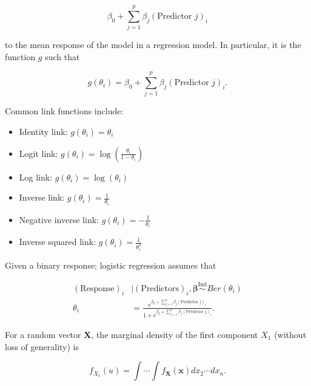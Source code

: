 \documentclass[
  letterpaper,
  DIV=11,
  numbers=noendperiod]{scrreprt}
\providecommand{\tightlist}{%
  \setlength{\itemsep}{0pt}\setlength{\parskip}{0pt}}\usepackage{longtable,booktabs,array}
\theoremstyle{definition}
\theoremstyle{definition}
\theoremstyle{plain}
\theoremstyle{remark}
\begin{document}
\[\beta_0 + \sum_{j=1}^{p} \beta_j (\text{Predictor } j)_i\]

to the mean response of the model in a regression model. In particular,
it is the function \(g\) such that

\[g\left(\theta_i\right) = \beta_0 + \sum_{j=1}^{p} \beta_j (\text{Predictor } j)_i.\]

Common link functions include:

\begin{itemize}
\tightlist
\item
  Identity link: \(g\left(\theta_i\right) = \theta_i\)
\item
  Logit link:
  \(g\left(\theta_i\right) = \log\left(\frac{\theta_i}{1 - \theta_i}\right)\)
\item
  Log link: \(g\left(\theta_i\right) = \log\left(\theta_i\right)\)
\item
  Inverse link: \(g\left(\theta_i\right) = \frac{1}{\theta_i}\)
\item
  Negative inverse link:
  \(g\left(\theta_i\right) = -\frac{1}{\theta_i}\)
\item
  Inverse squared link:
  \(g\left(\theta_i\right) = \frac{1}{\theta_i^2}\)
\end{itemize}

\begin{description}
\tightlist
\item[Logistic Regression (Definition~\ref{def-logistic-regression})]
Given a binary response; logistic regression assumes that
\end{description}

\[
\begin{aligned}
  (\text{Response})_i &\mid (\text{Predictors})_i, \boldsymbol{\beta} \stackrel{\text{Ind}}{\sim}Ber\left(\theta_i\right) \\
  \theta_i &= \frac{e^{\beta_0 + \sum_{j=1}^{p} \beta_j (\text{Predictor } j)_i}}{1 + e^{\beta_0 + \sum_{j=1}^{p} \beta_j (\text{Predictor } j)_i}}.
\end{aligned}
\]

\begin{description}
\tightlist
\item[Marginal Density (Definition~\ref{def-marginal-density})]
For a random vector \(\mathbf{X}\), the marginal density of the first
component \(X_1\) (without loss of generality) is
\end{description}

\[f_{X_1}(u) = \int \dotsi \int f_{\mathbf{X}}(\mathbf{x}) dx_2 \dotsb dx_n.\]
\end{document}
